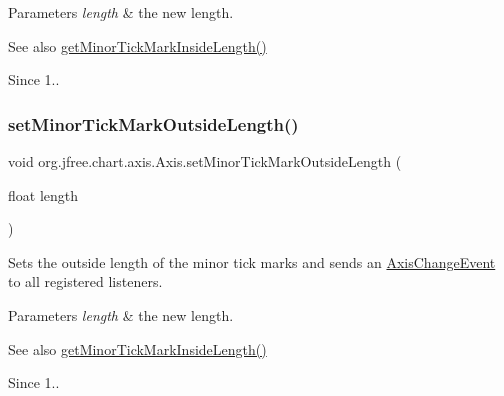 \begin{DoxyParams}{Parameters}
{\em length} & the new length.\\
\hline
\end{DoxyParams}
\begin{DoxySeeAlso}{See also}
\mbox{\hyperlink{classorg_1_1jfree_1_1chart_1_1axis_1_1_axis_a99f2ec9bc2d5fb31247c7c6194ed5402}{get\+Minor\+Tick\+Mark\+Inside\+Length()}}
\end{DoxySeeAlso}
\begin{DoxySince}{Since}
1.. 
\end{DoxySince}
\mbox{\label{classorg_1_1jfree_1_1chart_1_1axis_1_1_axis_a9c16bacaf75deb9b448085e067652426}} 
\subsubsection{\texorpdfstring{set\+Minor\+Tick\+Mark\+Outside\+Length()}{setMinorTickMarkOutsideLength()}}
{\footnotesize\ttfamily void org.\+jfree.\+chart.\+axis.\+Axis.\+set\+Minor\+Tick\+Mark\+Outside\+Length (\begin{DoxyParamCaption}\item[{float}]{length }\end{DoxyParamCaption})}

Sets the outside length of the minor tick marks and sends an \mbox{\hyperlink{}{Axis\+Change\+Event}} to all registered listeners.


\begin{DoxyParams}{Parameters}
{\em length} & the new length.\\
\hline
\end{DoxyParams}
\begin{DoxySeeAlso}{See also}
\mbox{\hyperlink{classorg_1_1jfree_1_1chart_1_1axis_1_1_axis_a99f2ec9bc2d5fb31247c7c6194ed5402}{get\+Minor\+Tick\+Mark\+Inside\+Length()}}
\end{DoxySeeAlso}
\begin{DoxySince}{Since}
1.. 
\end{DoxySince}
\mbox{\label{classorg_1_1jfree_1_1chart_1_1axis_1_1_axis_a00f878920447c433934aa54030843def}} 
